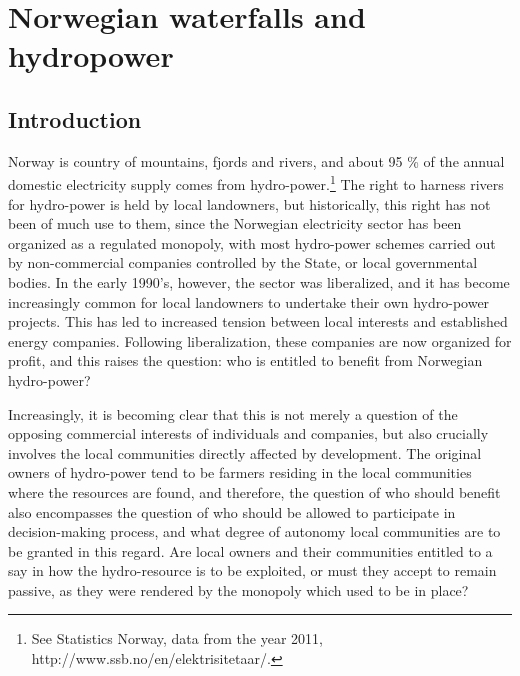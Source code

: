 \chapter{Norwegian waterfalls and hydropower}\label{chap:3}

\section{Introduction}\label{intro}

Norway is country of mountains, fjords and rivers, and about 95 \% of the annual domestic electricity supply comes from hydro-power.\footnote{See Statistics Norway, data from the year 2011, http://www.ssb.no/en/elektrisitetaar/.} The right to harness rivers for hydro-power is held by local landowners, but historically, this right has not been of much use to them, since the Norwegian electricity sector has been organized as a regulated monopoly, with most hydro-power schemes carried out by non-commercial companies controlled by the State, or local governmental bodies. In the early 1990's, however, the sector was liberalized, and it has become increasingly common for local landowners to undertake their own hydro-power projects. This has led to increased tension between local interests and established energy companies. Following liberalization, these companies are now organized for profit, and this raises the question: who is entitled to benefit from Norwegian hydro-power? 

Increasingly, it is becoming clear that this is not merely a question of the opposing commercial interests of individuals and companies, but also crucially involves the local communities directly affected by development. The original owners of hydro-power tend to be farmers residing in the local communities where the resources are found, and therefore, the question of who should benefit also encompasses the question of who should be allowed to participate in decision-making process, and what degree of autonomy local communities are to be granted in this regard. Are local owners and their communities entitled to a say in how the hydro-resource is to be exploited, or must they accept to remain passive, as they were rendered by the monopoly which used to be in place?

